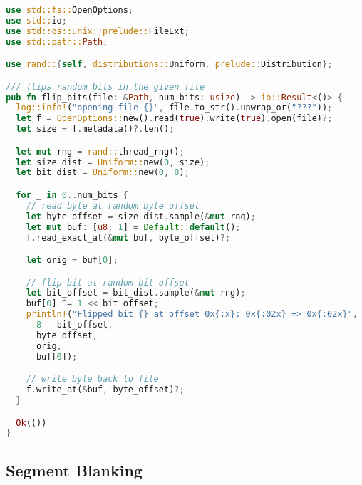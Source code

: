 \begin{lstlisting}[language=Rust]
use std::fs::OpenOptions;
use std::io;
use std::os::unix::prelude::FileExt;
use std::path::Path;

use rand::{self, distributions::Uniform, prelude::Distribution};

/// flips random bits in the given file
pub fn flip_bits(file: &Path, num_bits: usize) -> io::Result<()> {
  log::info!("opening file {}", file.to_str().unwrap_or("???"));
  let f = OpenOptions::new().read(true).write(true).open(file)?;
  let size = f.metadata()?.len();

  let mut rng = rand::thread_rng();
  let size_dist = Uniform::new(0, size);
  let bit_dist = Uniform::new(0, 8);

  for _ in 0..num_bits {
    // read byte at random byte offset
    let byte_offset = size_dist.sample(&mut rng);
    let mut buf: [u8; 1] = Default::default();
    f.read_exact_at(&mut buf, byte_offset)?;

    let orig = buf[0];

    // flip bit at random bit offset
    let bit_offset = bit_dist.sample(&mut rng);
    buf[0] ^= 1 << bit_offset;
    println!("Flipped bit {} at offset 0x{:x}: 0x{:02x} => 0x{:02x}",
      8 - bit_offset,
      byte_offset,
      orig,
      buf[0]);

    // write byte back to file
    f.write_at(&buf, byte_offset)?;
  }

  Ok(())
}
\end{lstlisting}

\newpage

\subsection{Segment Blanking}

